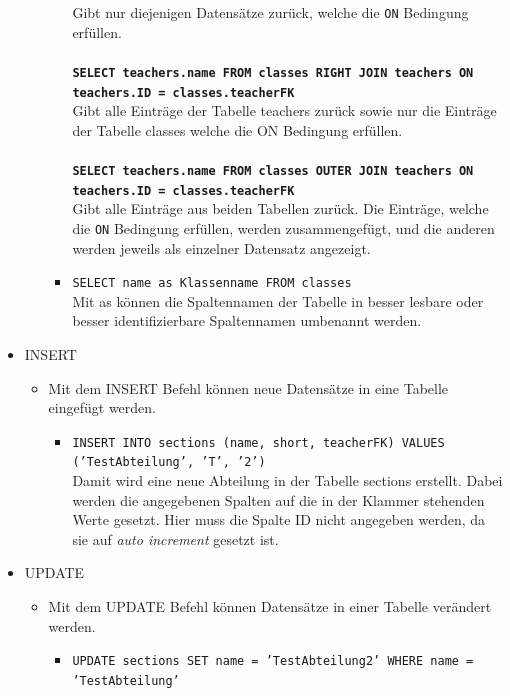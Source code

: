 \begin{itemize}
\begin{itemize}
\begin{itemize}
		    			Gibt nur diejenigen Datensätze zurück, welche die \texttt{ON} Bedingung erfüllen.\\\\
		    		\textbf{\texttt{SELECT teachers.name FROM classes RIGHT JOIN teachers ON teachers.ID = classes.teacherFK}}\\
		    			Gibt alle Einträge der Tabelle teachers zurück sowie nur die Einträge der Tabelle classes welche die ON Bedingung erfüllen.\\\\
		    		\textbf{\texttt{SELECT teachers.name FROM classes OUTER JOIN teachers ON teachers.ID = classes.teacherFK}}\\
		    			Gibt alle Einträge aus beiden Tabellen zurück. Die Einträge, welche die \texttt{ON} Bedingung erfüllen, werden zusammengefügt, und die anderen werden jeweils als einzelner Datensatz angezeigt.\\
		    	\item \texttt{SELECT name as Klassenname FROM classes}\\
		    		Mit as können die Spaltennamen der Tabelle in besser lesbare oder besser identifizierbare Spaltennamen umbenannt werden.
	    	\end{itemize}
    	\end{itemize}
    \item INSERT
	    \begin{itemize}
		   	\item Mit dem INSERT Befehl können neue Datensätze in eine Tabelle eingefügt werden.
		   	\begin{itemize}
			   	\item \texttt{INSERT INTO sections (name, short, teacherFK) VALUES ('TestAbteilung', 'T', '2')}\\
			   		Damit wird eine neue Abteilung in der Tabelle sections erstellt. Dabei werden die angegebenen Spalten auf die in der Klammer stehenden Werte gesetzt. Hier muss die Spalte ID nicht angegeben werden, da sie auf \textit{auto increment} gesetzt ist.
		   	\end{itemize}
	    \end{itemize}
	\item UPDATE
		\begin{itemize}
			\item Mit dem UPDATE Befehl können Datensätze in einer Tabelle verändert werden.
			\begin{itemize}
				\item \texttt{UPDATE sections SET name = 'TestAbteilung2' WHERE name = 'TestAbteilung'}\\

\end{itemize}
\end{itemize}
\end{itemize}
